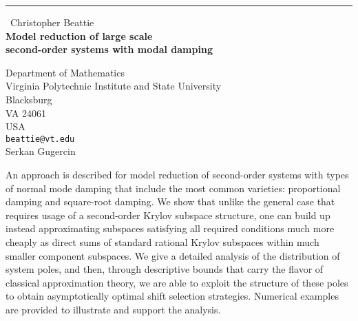 \documentclass{report}
\begin{document}
\begin{center}
\rule{6in}{1pt} \
{\large Christopher Beattie \\
{\bf Model reduction of large scale \\ second-order systems with modal damping}}

Department of Mathematics \\ Virginia Polytechnic Institute and State University \\ Blacksburg \\ VA 24061 \\ USA
\\
{\tt beattie@vt.edu}\\
Serkan Gugercin\end{center}

An approach is described for model reduction of second-order systems
with types of normal mode damping that include the most common
varieties: proportional damping and square-root damping.
We show that unlike the general case that requires usage
of a second-order Krylov subspace structure, one can build up instead
approximating subspaces satisfying all required conditions much
more cheaply as direct sums of standard rational Krylov subspaces
within much smaller component subspaces.
We give a detailed analysis of the distribution of system poles,
and then, through descriptive bounds that carry the flavor of classical
approximation theory, we are able to exploit the structure of these
poles to obtain asymptotically optimal shift selection strategies.
Numerical examples are provided to illustrate and support the analysis.
\end{document}
